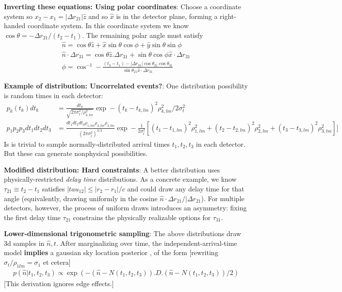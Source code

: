 \documentclass[twocolumn,prd,nofootinbib]{revtex4}
\begin{document}
\begin{widetext}
\begin{shaded}
\noindent \textbf{Inverting these equations: Using polar coordinates}: Choose a coordinate system so $x_2-x_1 =|\Delta
r_{21}| \hat{z}$ and so $\hat{x}$ is in the detector plane, forming a right-handed coordinate system.  In this coordinate system we know $\cos \theta = -\Delta r_{21}/(t_2-t_1)$.  The remaining polar angle
must satisfy 
\begin{eqnarray}
\hat{n} = \cos \theta \hat{z} + \hat{x}\sin\theta \cos \phi + \hat{y} \sin\theta \sin\phi \\
\hat{n}\cdot \Delta r_{31} =  \cos \theta \hat{z}.\Delta r_{31} + \sin \theta \cos \phi \hat{x} \cdot \Delta r_{31} \\
\phi = \cos^{-1} - \frac{(t_3-t_1)  - |\Delta r_{31}| \cos \theta_{21}\cos \theta_{31} }{ \sin \theta_{21}  \hat{x}\cdot
  \Delta r_{31}}
\end{eqnarray}

\end{shaded}

\begin{shaded}
\noindent \textbf{Example of distribution: Uncorrelated events?}: One distribution possibility is random times in each detector:
\begin{align}
p_k(t_k) dt_k &= \frac{dt_k}{\sqrt{2\pi  \sigma_t^2/\rho_{k,lm}^2}} \exp - (t_k - t_{k,lm})^2 \rho_{k,lm}^2/2\sigma_t^2 \\
p_1 p_2 p_3 dt_1 dt_2 dt_3 &= \frac{dt_1 dt_2 dt_3 \rho_{1,lm}\rho_{2,lm}\rho_{3,lm}}{(2\pi \sigma_t^2)^{3/2}}
 \exp - \frac{1}{2\sigma_t^2}\left[ (t_1 - t_{1,lm})^2 \rho_{1,lm}^2 + (t_2 - t_{2,lm})^2 \rho_{2,lm}^2 + (t_3 -
   t_{3,lm})^2 \rho_{3,lm}^2 \right]]
\end{align}
Is is trivial to sample normally-distributed  arrival times $t_1,t_2,t_3$ in each detector.  But these can generate
nonphysical possibilities.

\noindent \textbf{Modified distribution: Hard constraints}: A better distribution uses physically-restricted \emph{delay
  time} distributions.  As a concrete example, we know  $\tau_{21}\equiv t_2-t_1$ satisfies $|tau_{12}| \le |r_2
-r_1|/c$ and could draw any delay time for that angle (equivalently, drawing uniformly in the cosine $\hat{n}\cdot
\Delta r_{21}/|\Delta r_{21}$).  For multiple detectors, however, the process of uniform draws introduces an asymmetry:
fixing the first delay time $\tau_{21}$ constrains the physically realizable options for $\tau_{31}$.
\end{shaded}


\noindent \textbf{Lower-dimensional trigonometric sampling}:  The above distributions draw 3d samples in $\hat{n},t$.
After marginalizing over time, the independent-arrival-time model \textbf{implies} a gaussian sky location posterior
\cite{2011CQGra..28j5021F}, of the form [rewriting $\sigma_t/\rho_{1lm} = \sigma_1$ et cetera]
\begin{eqnarray}
p(\hat{n}|t_1,t_2,t_3) \propto \exp(- (\hat{n}-N(t_1,t_2,t_3)).D.(\hat{n}-N(t_1,t_2,t_3))/2)
\end{eqnarray}
[This derivation ignores edge effects.]


\end{widetext}
\end{document}
